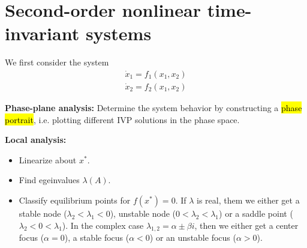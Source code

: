 \section{Second-order nonlinear time-invariant systems}
We first consider the system
\begin{equation}
\begin{array}{l}{\dot{x}_{1}=f_{1}\left(x_{1}, x_{2}\right)} \\ {\dot{x}_{2}=f_{2}\left(x_{1}, x_{2}\right)}\end{array}
\end{equation}

\textbf{Phase-plane analysis:} Determine the system behavior by constructing a \hl{phase portrait}, i.e. plotting different IVP solutions in the phase space.

\begin{tcolorbox}[colback=white, colframe=teal]
\textbf{Local analysis:}
\begin{itemize}[topsep=0pt]
    \item Linearize about $x^*$.
    \item Find egeinvalues $\lambda(A)$.
    \item Classify equilibrium points for $f(x^*) = 0$.
    If $\lambda$ is real, them we either get a stable node ($\lambda_2 < \lambda_1 < 0$), unstable node ($0 < \lambda_2 < \lambda_1$) or a saddle point ($\lambda_2 < 0 < \lambda_1$).
    In the complex case $\lambda_{1,2} = \alpha \pm \beta i$, then we either get a center focus ($\alpha = 0$), a stable focus ($\alpha < 0$) or an unstable focus ($\alpha > 0$).
\end{itemize}
\end{tcolorbox}


